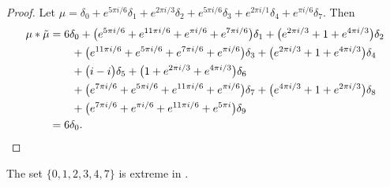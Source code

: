 \begin{proof}
Let $\mu =
 \delta_{0}  +   e^{ 5\pi i  / 6}\delta_{1}  +   e^{ 2\pi i  / 3}\delta_{2}  +   e^{ 5\pi i  / 6}\delta_{3}  +   e^{ 2\pi i  / 1}\delta_{4}  +   e^{\pi i / 6}\delta_{7}
.$
  Then
\begin{align*} \mu * \tilde\mu&=   6\delta_{0}   +  \big( e^{ 5 \pi i / 6}+ e^{ 11 \pi i / 6}+ e^{\pi i / 6}+ e^{ 7 \pi i / 6}\big)\delta_{1} 
  +  \big( e^{ 2 \pi i / 3}+ 1+ e^{ 4 \pi i / 3}\big)\delta_{2} 
  \\& \qquad 
  +  \big( e^{ 11 \pi i / 6}+ e^{ 5 \pi i / 6}+ e^{ 7 \pi i / 6}+ e^{\pi i / 6}\big)\delta_{3} 
   +  \big( e^{ 2 \pi i / 3}+ 1+ e^{ 4 \pi i / 3}\big)\delta_{4} 
  \\& \qquad
   +  \big(  i - i\big)\delta_{5} 
   +  \big( 1+ e^{ 2 \pi i / 3}+ e^{ 4 \pi i / 3}\big)\delta_{6} 
  \\& \qquad
   +  \big( e^{ 7 \pi i / 6}+ e^{ 5 \pi i / 6}+ e^{ 11 \pi i / 6}+ e^{\pi i / 6}\big)\delta_{7} 
   +  \big( e^{ 4 \pi i / 3}+ 1+ e^{ 2 \pi i / 3}\big)\delta_{8} 
  \\& \qquad +  \big( e^{ 7 \pi i / 6}+ e^{\pi i / 6}+ e^{ 11 \pi i / 6}+ e^{ 5 \pi i}\big)\delta_{9} 
  \\&=6\delta_0.
      \qedhere
\end{align*}
\end{proof}


\begin{prop}\label{prop6in14}
The set $\{ 0,1,2,3,4,7 \}$ is extreme in .
\end{prop}

